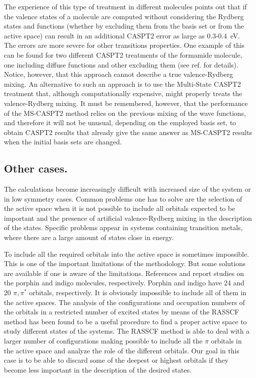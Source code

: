 The experience of this type of treatment in different molecules 
\cite{Roos:96b,Roos:95b,Fuelscher:97a} points out that if the valence states
of a molecule are computed without considering the Rydberg states and
functions (whether by excluding them from the basis set or from the
active space) can result in an additional CASPT2 error as large as 0.3-0.4~eV.
The errors are
more severe for other transitions properties. One example of this can be
found for two different CASPT2 treatments of the formamide molecule,
one including diffuse functions and other excluding
them (see ref. \cite{Serrano:96c} for details). Notice, however, that this
approach cannot describe a true valence-Rydberg mixing. 
An alternative to such an approach is to use the Multi-State
CASPT2 treatment that, although computationally expensive, might properly
treats the valence-Rydberg mixing. It must be remembered, however, that
the performance of the MS-CASPT2 method relies on the previous mixing of
the wave functions, and therefore it will not be unusual, depending on the
employed basis set, to obtain CASPT2 results that already give the same
answer as MS-CASPT2 results when the initial basis sets are changed.

\subsection{Other cases.}

The calculations become increasingly difficult with increased
size of the system or in low symmetry cases. Common
problems one has to solve are the selection of the active space when it
is not possible to include all orbitals expected to be important and
the presence of artificial valence-Rydberg mixing in the description
of the states. Specific problems appear in systems containing transition
metals, where there are a large amount of states close in energy.


To include all the required orbitals into the active space is sometimes 
impossible. This is one of the important limitations of the methodology.
But some solutions are
available if one is aware of the limitations. References
\cite{Merchan:94b} and \cite{Serrano:97a} report
studies on the porphin and indigo molecules, respectively.
Porphin and indigo have 24 and 20 $\pi,\pi^*$ orbitals, respectively.
It is obviously impossible to include all of them in the active
spaces. The analysis of the configurations and occupation numbers
of the orbitals in a restricted number of excited states by means of
the RASSCF method has been found to be a useful procedure to
find a proper active space to study different states of the systems.
The RASSCF method is able to deal with a larger number of configurations
making possible to include all the $\pi$ orbitals in the active space
and analyze the role of the different orbitals. Our goal in this case
is to be able to discard some of the deepest or highest orbitals if they
become less important in the description of the desired states.

